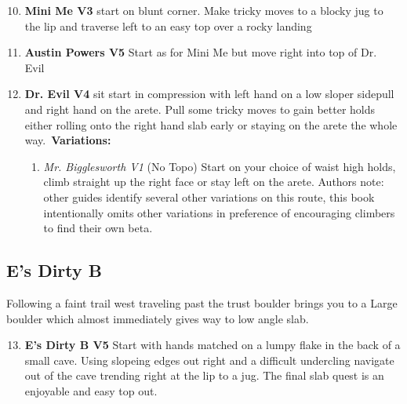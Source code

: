 \begin{enumerate}[]
	\setcounter{enumi}{9}
	\item\label{rt:Mini Me} \colorbox{green!20}{\textbf{Mini Me V3  } }
	\newline start on blunt corner. Make tricky moves to a blocky jug to the lip and traverse left to an easy top over a rocky landing\
	\setcounter{enumi}{10}
	\item\label{rt:Austin Powers} \colorbox{RoyalBlue!20}{\textbf{Austin Powers V5    } }
	\newline Start as for Mini Me but move right into top of Dr. Evil\
	\setcounter{enumi}{11}
	\item\label{rt:Dr. Evil} \colorbox{RoyalBlue!20}{\textbf{Dr. Evil V4    } }
	\newline sit start in compression with left hand on a low sloper sidepull and right hand on the arete. Pull some tricky moves to gain better holds either rolling onto the right hand slab early or staying on the arete the whole way.\
	\newline \textbf{Variations:}
	\begin{enumerate}
		\item\label{vr:Mr. Bigglesworth} \colorbox{green!20}{\emph{Mr. Bigglesworth V1 \ding{72} \ding{72}  }  }
		\newline (No Topo) 
		\newline Start on your choice of waist high holds, climb straight up the right face or stay left on the arete. Authors note: other guides identify several other variations on this route, this book intentionally omits other variations in preference of encouraging climbers to find their own beta.\
	\end{enumerate}
\end{enumerate}
\subsection*{E's Dirty B}\label{bf:E's Dirty B}
Following a faint trail west traveling past the trust boulder brings you to a Large boulder which almost immediately gives way to low angle slab.

\begin{enumerate}[]
	\setcounter{enumi}{12}
	\item\label{rt:E's Dirty B} \colorbox{RoyalBlue!20}{\textbf{E's Dirty B V5 \ding{72} \ding{72}  } }
	\newline Start with hands matched on a lumpy flake in the back of a small cave. Using slopeing edges out right and a difficult undercling navigate out of the cave trending right at the lip to a jug. The final slab quest is an enjoyable and easy top out.\
\end{enumerate}
